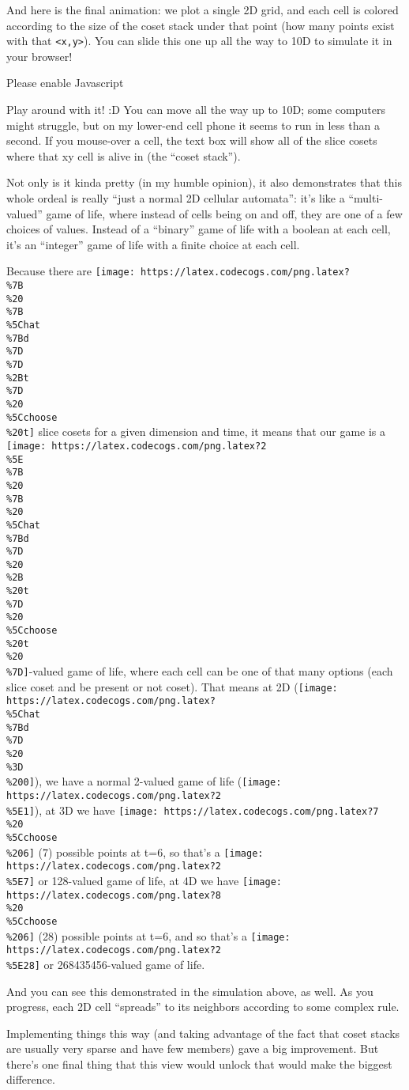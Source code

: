 \documentclass[]{article}
\begin{document}
And here is the final animation: we plot a single 2D grid, and each cell is
colored according to the size of the coset stack under that point (how many
points exist with that \texttt{\textless{}x,y\textgreater{}}). You can slide
this one up all the way to 10D to simulate it in your browser!

\leavevmode\hypertarget{golFlat}{}%
Please enable Javascript

Play around with it! :D You can move all the way up to 10D; some computers might
struggle, but on my lower-end cell phone it seems to run in less than a second.
If you mouse-over a cell, the text box will show all of the slice cosets where
that xy cell is alive in (the ``coset stack'').

Not only is it kinda pretty (in my humble opinion), it also demonstrates that
this whole ordeal is really ``just a normal 2D cellular automata'': it's like a
``multi-valued'' game of life, where instead of cells being on and off, they are
one of a few choices of values. Instead of a ``binary'' game of life with a
boolean at each cell, it's an ``integer'' game of life with a finite choice at
each cell.

Because there are
\texttt{[image: https://latex.codecogs.com/png.latex?\\\%7B\\\%20\\\%7B\\\%5Chat\\\%7Bd\\\%7D\\\%7D\\\%2Bt\\\%7D\\\%20\\\%5Cchoose\\\%20t]}
slice cosets for a given dimension and time, it means that our game is a
\texttt{[image: https://latex.codecogs.com/png.latex?2\\\%5E\\\%7B\\\%20\\\%7B\\\%20\\\%5Chat\\\%7Bd\\\%7D\\\%20\\\%2B\\\%20t\\\%7D\\\%20\\\%5Cchoose\\\%20t\\\%20\\\%7D]}-valued
game of life, where each cell can be one of that many options (each slice coset
and be present or not coset). That means at 2D
(\texttt{[image: https://latex.codecogs.com/png.latex?\\\%5Chat\\\%7Bd\\\%7D\\\%20\\\%3D\\\%200]}),
we have a normal 2-valued game of life
(\texttt{[image: https://latex.codecogs.com/png.latex?2\\\%5E1]}), at 3D we have
\texttt{[image: https://latex.codecogs.com/png.latex?7\\\%20\\\%5Cchoose\\\%206]} (7)
possible points at t=6, so that's a
\texttt{[image: https://latex.codecogs.com/png.latex?2\\\%5E7]} or 128-valued game
of life, at 4D we have
\texttt{[image: https://latex.codecogs.com/png.latex?8\\\%20\\\%5Cchoose\\\%206]} (28)
possible points at t=6, and so that's a
\texttt{[image: https://latex.codecogs.com/png.latex?2\\\%5E28]} or
268435456-valued game of life.

And you can see this demonstrated in the simulation above, as well. As you
progress, each 2D cell ``spreads'' to its neighbors according to some complex
rule.

Implementing things this way (and taking advantage of the fact that coset stacks
are usually very sparse and have few members) gave a big improvement. But
there's one final thing that this view would unlock that would make the biggest
difference.
\end{document}
